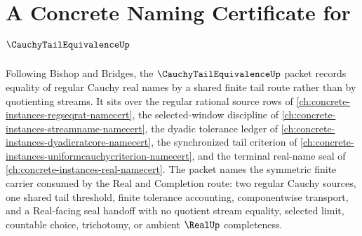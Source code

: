 \chapter{A Concrete Naming Certificate for $\CauchyTailEquivalenceUp$}
\label{ch:concrete-instances-cauchy-tail-equivalence-namecert}

Following Bishop and Bridges, the $\CauchyTailEquivalenceUp$ packet records equality of regular Cauchy real names by a shared finite tail route rather than by quotienting streams. It sits over the regular rational source rows of \autoref{ch:concrete-instances-regseqrat-namecert}, the selected-window discipline of \autoref{ch:concrete-instances-streamname-namecert}, the dyadic tolerance ledger of \autoref{ch:concrete-instances-dyadicratcore-namecert}, the synchronized tail criterion of \autoref{ch:concrete-instances-uniformcauchycriterion-namecert}, and the terminal real-name seal of \autoref{ch:concrete-instances-real-namecert}. The packet names the symmetric finite carrier consumed by the Real and Completion route: two regular Cauchy sources, one shared tail threshold, finite tolerance accounting, componentwise transport, and a Real-facing seal handoff with no quotient stream equality, selected limit, countable choice, trichotomy, or ambient $\RealUp$ completeness.

